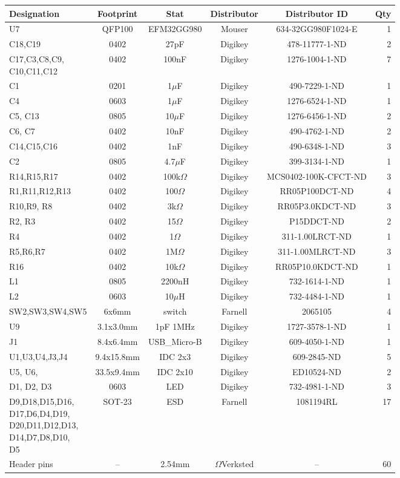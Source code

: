\small
\begin{tabular}{@{} l|c|c|c|c|r @{}}
    Designation & Footprint & Stat & Distributor & Distributor ID & Qty \\ \hline
    U7 & QFP100 & EFM32GG980 & Mouser & 634-32GG980F1024-E & 1\\
    C18,C19 & 0402 & 27pF & Digikey & 478-11777-1-ND & 2 \\
    \parbox[t]{3cm}{C17,C3,C8,C9,\\C10,C11,C12} & 0402 & 100nF & Digikey & 1276-1004-1-ND & 7\\
    C1 & 0201 & 1$\mu$F & Digikey & 490-7229-1-ND & 1\\
    C4 & 0603 & 1$\mu$F & Digikey & 1276-6524-1-ND & 1\\
    C5, C13 & 0805 & 10$\mu$F & Digikey & 1276-6456-1-ND & 2\\
    C6, C7 & 0402 & 10nF & Digikey & 490-4762-1-ND & 2\\
    C14,C15,C16 & 0402 & 1nF & Digikey & 490-6348-1-ND & 3\\
    C2 & 0805 & 4.7$\mu$F & Digikey & 399-3134-1-ND & 1\\ \hline
    R14,R15,R17 & 0402 & 100k$\Omega$ & Digikey & MCS0402-100K-CFCT-ND & 3\\
    R1,R11,R12,R13 & 0402 & 100$\Omega$ & Digikey & RR05P100DCT-ND & 4\\
    R10,R9, R8 & 0402 & 3k$\Omega$ & Digikey & RR05P3.0KDCT-ND & 3\\
    R2, R3 & 0402 & 15$\Omega$ & Digikey & P15DDCT-ND & 2\\
    R4 & 0402 & 1$\Omega$ & Digikey & 311-1.00LRCT-ND & 1\\
    R5,R6,R7 & 0402 & 1M$\Omega$ & Digikey & 311-1.00MLRCT-ND & 3\\
    R16 & 0402 & 10k$\Omega$ & Digikey & RR05P10.0KDCT-ND & 1\\ \hline
    L1 & 0805 & 2200nH& Digikey & 732-1614-1-ND & 1 \\
    L2 & 0603 & 10$\mu$H & Digikey & 732-4484-1-ND & 1\\ \hline
    SW2,SW3,SW4,SW5 & 6x6mm & switch & Farnell & 2065105 & 4\\
    U9 & 3.1x3.0mm & 1pF 1MHz & Digikey & 1727-3578-1-ND & 1\\
    J1 & 8.4x6.4mm & USB\_Micro-B & Digikey & 609-4050-1-ND & 1\\
    U1,U3,U4,J3,J4 & 9.4x15.8mm & IDC 2x3 & Digikey & 609-2845-ND & 5\\  
    U5, U6, & 33.5x9.4mm & IDC 2x10 & Digikey & ED10524-ND & 2\\
    D1, D2, D3 & 0603 & LED & Digikey & 732-4981-1-ND & 3\\
    \parbox[t]{3cm}{D9,D18,D15,D16,\\D17,D6,D4,D19,\\D20,D11,D12,D13,\\D14,D7,D8,D10,\\D5} & SOT-23 & ESD & Farnell & 1081194RL & 17\\
    Header pins & -- & 2.54mm & $\Omega$Verksted & -- & 60\\
\end{tabular}
\normalsize

